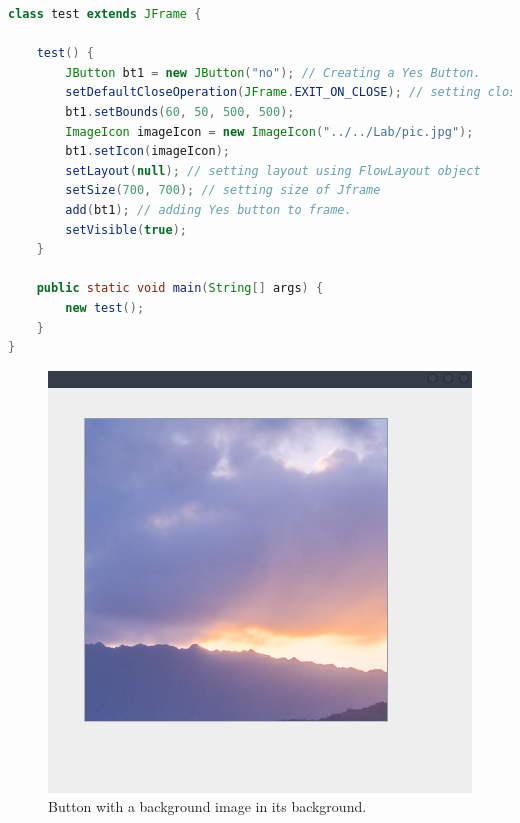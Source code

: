 \documentclass[11pt]{article}
\begin{document}
\begin{enumerate}
\begin{lstlisting}[language=Java]
class test extends JFrame {

    test() {
        JButton bt1 = new JButton("no"); // Creating a Yes Button.
        setDefaultCloseOperation(JFrame.EXIT_ON_CLOSE); // setting close operation.
        bt1.setBounds(60, 50, 500, 500);
        ImageIcon imageIcon = new ImageIcon("../../Lab/pic.jpg");
        bt1.setIcon(imageIcon);
        setLayout(null); // setting layout using FlowLayout object
        setSize(700, 700); // setting size of Jframe
        add(bt1); // adding Yes button to frame.
        setVisible(true);
    }

    public static void main(String[] args) {
        new test();
    }
}
\end{lstlisting}

	      \begin{figure}[H]
		      \centering
		      \includegraphics[scale=0.5]{buttonpic.png}
		      \caption{Button with a background image in its background. }
	      \end{figure}
\end{enumerate}
\end{document}
